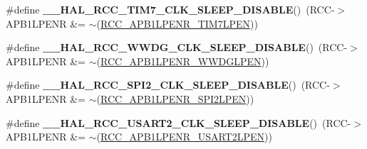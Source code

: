 \begin{DoxyCompactItemize}
\item 
\hypertarget{group___r_c_c___peripheral___clock___sleep___enable___disable_ga65016901a197f433425aca0a206b0c77}{\#define {\bfseries \-\_\-\-\_\-\-H\-A\-L\-\_\-\-R\-C\-C\-\_\-\-T\-I\-M7\-\_\-\-C\-L\-K\-\_\-\-S\-L\-E\-E\-P\-\_\-\-D\-I\-S\-A\-B\-L\-E}()~(R\-C\-C-\/$>$A\-P\-B1\-L\-P\-E\-N\-R \&= $\sim$(\hyperlink{group___peripheral___registers___bits___definition_gab7867dc2695855fa9084a13d06a4299f}{R\-C\-C\-\_\-\-A\-P\-B1\-L\-P\-E\-N\-R\-\_\-\-T\-I\-M7\-L\-P\-E\-N}))}\label{group___r_c_c___peripheral___clock___sleep___enable___disable_ga65016901a197f433425aca0a206b0c77}

\item 
\hypertarget{group___r_c_c___peripheral___clock___sleep___enable___disable_gae61c24ac6b36e7edbabc5b050b38d63e}{\#define {\bfseries \-\_\-\-\_\-\-H\-A\-L\-\_\-\-R\-C\-C\-\_\-\-W\-W\-D\-G\-\_\-\-C\-L\-K\-\_\-\-S\-L\-E\-E\-P\-\_\-\-D\-I\-S\-A\-B\-L\-E}()~(R\-C\-C-\/$>$A\-P\-B1\-L\-P\-E\-N\-R \&= $\sim$(\hyperlink{group___peripheral___registers___bits___definition_ga13f3db4ac67bf32c994364cc43f4fe8b}{R\-C\-C\-\_\-\-A\-P\-B1\-L\-P\-E\-N\-R\-\_\-\-W\-W\-D\-G\-L\-P\-E\-N}))}\label{group___r_c_c___peripheral___clock___sleep___enable___disable_gae61c24ac6b36e7edbabc5b050b38d63e}

\item 
\hypertarget{group___r_c_c___peripheral___clock___sleep___enable___disable_ga4fff9b3416d2940cac20962e6d5655ec}{\#define {\bfseries \-\_\-\-\_\-\-H\-A\-L\-\_\-\-R\-C\-C\-\_\-\-S\-P\-I2\-\_\-\-C\-L\-K\-\_\-\-S\-L\-E\-E\-P\-\_\-\-D\-I\-S\-A\-B\-L\-E}()~(R\-C\-C-\/$>$A\-P\-B1\-L\-P\-E\-N\-R \&= $\sim$(\hyperlink{group___peripheral___registers___bits___definition_ga41dcbf845448cbb1b75c0ad7e83b77cb}{R\-C\-C\-\_\-\-A\-P\-B1\-L\-P\-E\-N\-R\-\_\-\-S\-P\-I2\-L\-P\-E\-N}))}\label{group___r_c_c___peripheral___clock___sleep___enable___disable_ga4fff9b3416d2940cac20962e6d5655ec}

\item 
\hypertarget{group___r_c_c___peripheral___clock___sleep___enable___disable_ga3ad038000c76cee2e7ca00d56ba64c17}{\#define {\bfseries \-\_\-\-\_\-\-H\-A\-L\-\_\-\-R\-C\-C\-\_\-\-U\-S\-A\-R\-T2\-\_\-\-C\-L\-K\-\_\-\-S\-L\-E\-E\-P\-\_\-\-D\-I\-S\-A\-B\-L\-E}()~(R\-C\-C-\/$>$A\-P\-B1\-L\-P\-E\-N\-R \&= $\sim$(\hyperlink{group___peripheral___registers___bits___definition_ga6055c39af369463e14d6ff2017043671}{R\-C\-C\-\_\-\-A\-P\-B1\-L\-P\-E\-N\-R\-\_\-\-U\-S\-A\-R\-T2\-L\-P\-E\-N}))}\label{group___r_c_c___peripheral___clock___sleep___enable___disable_ga3ad038000c76cee2e7ca00d56ba64c17}


\end{DoxyCompactItemize}

